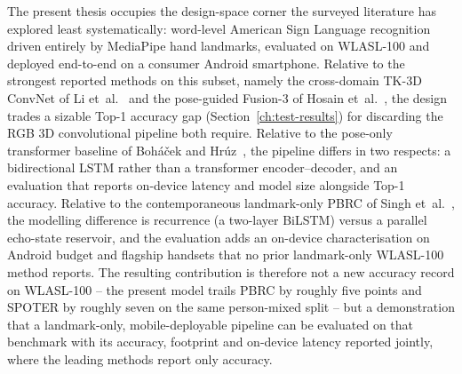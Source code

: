 The present thesis occupies the design-space corner the surveyed
literature has explored least systematically: word-level American
Sign Language recognition driven entirely by MediaPipe hand
landmarks, evaluated on WLASL-100 and deployed end-to-end on a
consumer Android smartphone. Relative to the strongest reported
methods on this subset, namely the cross-domain TK-3D ConvNet of Li
et~al.~\cite{li2020transferring} and the pose-guided Fusion-3 of
Hosain et~al.~\cite{hosain2021fusion}, the design trades a sizable
Top-1 accuracy gap (Section~\ref{ch:test-results}) for discarding the
RGB 3D convolutional pipeline both require. Relative to the pose-only transformer baseline of
Boh\'a\v{c}ek and Hr\'uz~\cite{bohacek2022spoter}, the pipeline
differs in two respects: a bidirectional LSTM rather than a
transformer encoder--decoder, and an evaluation that reports
on-device latency and model size alongside Top-1 accuracy. Relative
to the contemporaneous landmark-only PBRC of Singh
et~al.~\cite{singh2026pbrc}, the modelling difference is recurrence
(a two-layer BiLSTM) versus a parallel echo-state reservoir, and the
evaluation adds an on-device characterisation on Android budget and
flagship handsets that no prior landmark-only WLASL-100 method
reports. The resulting contribution is therefore not a new accuracy
record on WLASL-100 -- the present model trails PBRC by roughly five
points and SPOTER by roughly seven on the same person-mixed split --
but a demonstration that a landmark-only, mobile-deployable pipeline
can be evaluated on that benchmark with its accuracy, footprint and
on-device latency reported jointly, where the leading methods report
only accuracy.
